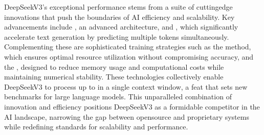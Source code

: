 \documentclass[letterpaper,11pt,english]{sphinxmanual}
\begin{document}
\sphinxAtStartPar
DeepSeek\sphinxhyphen{}V3’s exceptional performance stems from a suite of cutting\sphinxhyphen{}edge
innovations that push the boundaries of AI efficiency and scalability.
Key advancements include , an
advanced  architecture, and , which significantly accelerate text generation by
predicting multiple tokens simultaneously. Complementing these are
sophisticated training strategies such as the  method, which ensures optimal resource utilization without
compromising accuracy, and the ,
designed to reduce memory usage and computational costs while
maintaining numerical stability. These technologies collectively enable
DeepSeek\sphinxhyphen{}V3 to process up to  in a single context
window, a feat that sets new benchmarks for large language models. This
unparalleled combination of innovation and efficiency positions
DeepSeek\sphinxhyphen{}V3 as a formidable competitor in the AI landscape, narrowing
the gap between open\sphinxhyphen{}source and proprietary systems while redefining
standards for scalability and performance. 
\end{document}
